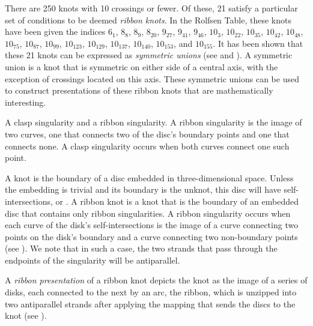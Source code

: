 \begin{paper}

There are 250 knots with 10 crossings or fewer.
Of these, 21 satisfy a particular set of conditions to be deemed \textit{ribbon
knots}.
In the Rolfsen Table, these knots have been given the indices $6_1$, $8_8$,
$8_9$, $8_{20}$, $9_{27}$, $9_{41}$, $9_{46}$, $10_3$, $10_{22}$, $10_{35}$,
$10_{42}$, $10_{48}$, $10_{75}$, $10_{87}$, $10_{99}$, $10_{123}$, $10_{129}$,
$10_{137}$, $10_{140}$, $10_{153}$, and $10_{155}$.
It has been shown that these 21 knots can be expressed as \textit{symmetric
unions} (see \cite{many} and \cite{one}).
A symmetric union is a knot that is symmetric on either side of a central axis,
with the exception of crossings located on this axis.
These symmetric unions can be used to construct presentations of these ribbon
knots that are mathematically interesting.

{A clasp singularity and a ribbon singularity.
A ribbon singularity is the image of two curves, one that connects two of the
disc's boundary points and one that connects none.
A clasp singularity occurs when both curves connect one such point.}

A knot is the boundary of a disc embedded in three-dimensional space.
Unless the embedding is trivial and its boundary is the unknot, this disc will
have self-intersections, or .
A ribbon knot is a knot that is the boundary of an embedded disc that contains
only ribbon singularities.
A ribbon singularity occurs when each curve of the disk's self-intersections is
the image of a curve connecting two points on the disk's boundary and a curve
connecting two non-boundary points (see \figSingularities).
We note that in such a case, the two strands that pass through the endpoints of
the singularity will be antiparallel.


A \textit{ribbon presentation} of a ribbon knot depicts the knot as the image of
a series of disks, each connected to the next by an arc, the ribbon, which is
unzipped into two antiparallel strands after applying the mapping that sends the
discs to the knot (see \figPresentation).


\end{paper}
